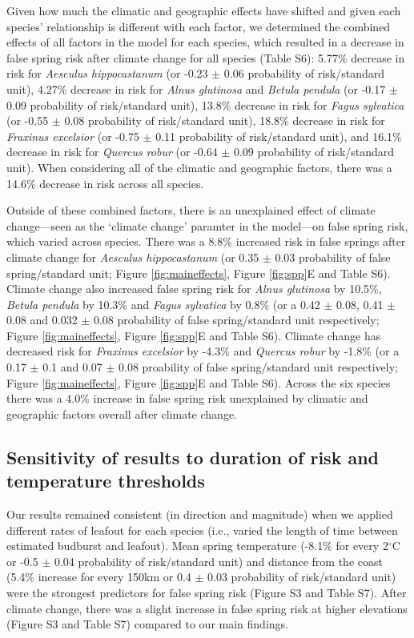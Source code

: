 \documentclass{article}\usepackage[]{graphicx}\usepackage[]{color}
\begin{document}
Given how much the climatic and geographic effects have shifted and given each species' relationship is different with each factor, we determined the combined effects of all factors in the model for each species, which resulted in a decrease in false spring risk after climate change for all species (Table S6): 5.77\% decrease in risk for \textit{Aesculus hippocastanum} (or -0.23 $\pm$ 0.06 probability of risk/standard unit), 4.27\% decrease in risk for \textit{Alnus glutinosa} and \textit{Betula pendula} (or -0.17 $\pm$ 0.09 probability of risk/standard unit), 13.8\% decrease in risk for \textit{Fagus sylvatica} (or -0.55 $\pm$ 0.08 probability of risk/standard unit), 18.8\% decrease in risk for \textit{Fraxinus excelsior} (or -0.75 $\pm$ 0.11 probability of risk/standard unit), and 16.1\% decrease in risk for \textit{Quercus robur} (or -0.64 $\pm$ 0.09 probability of risk/standard unit). When considering all of the climatic and geographic factors, there was a 14.6\% decrease in risk across all species. %

Outside of these combined factors, there is an unexplained effect of climate change---seen as the `climate change' paramter in the model---on false spring risk, which varied across species. There was a 8.8\% increased risk in false springs after climate change for \textit{Aesculus hippocastanum} (or 0.35 $\pm$ 0.03 probability of false spring/standard unit; Figure \ref{fig:maineffects}, Figure \ref{fig:spp}E and Table S6). Climate change also increased false spring risk for \textit{Alnus glutinosa} by 10.5\%, \textit{Betula pendula} by 10.3\% and \textit{Fagus sylvatica} by 0.8\% (or a 0.42 $\pm$ 0.08, 0.41 $\pm$ 0.08 and 0.032 $\pm$ 0.08 probability of false spring/standard unit respectively; Figure \ref{fig:maineffects}, Figure \ref{fig:spp}E and Table S6). Climate change has decreased risk for \textit{Fraxinus excelsior} by -4.3\% and \textit{Quercus robur} by -1.8\% (or a 0.17 $\pm$ 0.1 and 0.07 $\pm$ 0.08 proability of false spring/standard unit respectively; Figure \ref{fig:maineffects}, Figure \ref{fig:spp}E and Table S6). Across the six species there was a 4.0\% increase in false spring risk unexplained by climatic and geographic factors overall after climate change.

\subsection*{Sensitivity of results to duration of risk and temperature thresholds}
Our results remained consistent (in direction and magnitude) when we applied different rates of leafout for each species (i.e., varied the length of time between estimated budburst and leafout). Mean spring temperature (-8.1\% for every 2$^\circ$C or -0.5 $\pm$ 0.04 probability of risk/standard unit) and distance from the coast (5.4\% increase for every 150km or 0.4 $\pm$ 0.03 probability of risk/standard unit) were the strongest predictors for false spring risk (Figure S3 and Table S7). After climate change, there was a slight increase in false spring risk at higher elevations (Figure S3 and Table S7) compared to our main findings. 
\end{document}
